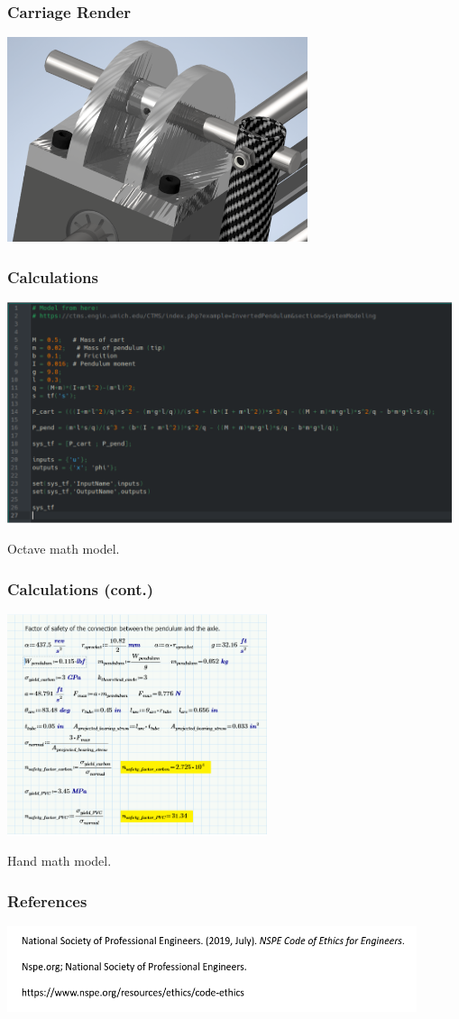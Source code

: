 \documentclass[aspectratio=169]{beamer}
\begin{document}
\begin{frame}
    \frametitle{Carriage Render}

    \includegraphics[height=6cm]{closeup5}
\end{frame}

\begin{frame}
    \frametitle{Calculations}

    \includegraphics[height=6.5cm]{Calculations}

    Octave math model.
\end{frame}

\begin{frame}
    \frametitle{Calculations (cont.)}

    \includegraphics[height=6.5cm]{CalculationsMatt}

    Hand math model.
\end{frame}

\begin{frame}
    \frametitle{References}

    \includegraphics[width=12cm]{CDRReferences}
\end{frame}
\end{document}
